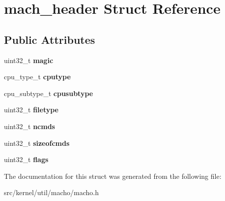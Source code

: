 \hypertarget{structmach__header}{}\section{mach\+\_\+header Struct Reference}
\label{structmach__header}
\subsection*{Public Attributes}
\begin{DoxyCompactItemize}
\item 
\mbox{\label{structmach__header_a3a6054fdf7cbb38d68c74f519272be9c}} 
uint32\+\_\+t {\bfseries magic}
\item 
\mbox{\label{structmach__header_a1c265fc1df7f57145ac206f811f625b3}} 
cpu\+\_\+type\+\_\+t {\bfseries cputype}
\item 
\mbox{\label{structmach__header_acd7ea1582093c2b63f63e09e0964b8f7}} 
cpu\+\_\+subtype\+\_\+t {\bfseries cpusubtype}
\item 
\mbox{\label{structmach__header_a37a5b8e8a1a3c8e695cb73095a60e6a5}} 
uint32\+\_\+t {\bfseries filetype}
\item 
\mbox{\label{structmach__header_a9906640688f0fdae8169a8ff540a3c83}} 
uint32\+\_\+t {\bfseries ncmds}
\item 
\mbox{\label{structmach__header_ac8dd4d339a6a32548f5f88dddfc19a0d}} 
uint32\+\_\+t {\bfseries sizeofcmds}
\item 
\mbox{\label{structmach__header_acf8b371e5ca92e8e61758a1f79365b7a}} 
uint32\+\_\+t {\bfseries flags}
\end{DoxyCompactItemize}


The documentation for this struct was generated from the following file\+:\begin{DoxyCompactItemize}
\item 
src/kernel/util/macho/macho.\+h\end{DoxyCompactItemize}
